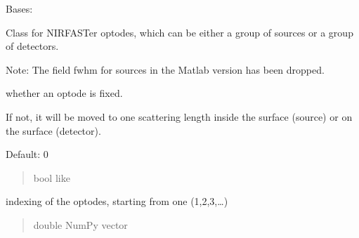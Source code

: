 \documentclass[letterpaper,10pt,english]{sphinxmanual}
\begin{document}
\begin{fulllineitems}
\label{\detokenize{_autosummary/nirfasterff.base.optodes.optode:nirfasterff.base.optodes.optode}}
\pysigstartsignatures
{}
\pysigstopsignatures
\sphinxAtStartPar
Bases: 

\sphinxAtStartPar
Class for NIRFASTer optodes, which can be either a group of sources or a group of detectors.

\sphinxAtStartPar
Note: The field fwhm for sources in the Matlab version has been dropped.

\begin{fulllineitems}
\label{\detokenize{_autosummary/nirfasterff.base.optodes.optode:nirfasterff.base.optodes.optode.fixed}}
\pysigstartsignatures
{}
\pysigstopsignatures
\sphinxAtStartPar
whether an optode is fixed.

\sphinxAtStartPar
If not, it will be moved to one scattering length inside the surface (source) or on the surface (detector).

\sphinxAtStartPar
Default: 0
\begin{quote}\begin{description}
\sphinxAtStartPar
bool like

\end{description}\end{quote}

\end{fulllineitems}


\begin{fulllineitems}
\label{\detokenize{_autosummary/nirfasterff.base.optodes.optode:nirfasterff.base.optodes.optode.num}}
\pysigstartsignatures
{}
\pysigstopsignatures
\sphinxAtStartPar
indexing of the optodes, starting from one (1,2,3,…)
\begin{quote}\begin{description}
\sphinxAtStartPar
double NumPy vector


\end{description}
\end{quote}
\end{fulllineitems}
\end{fulllineitems}
\end{document}
